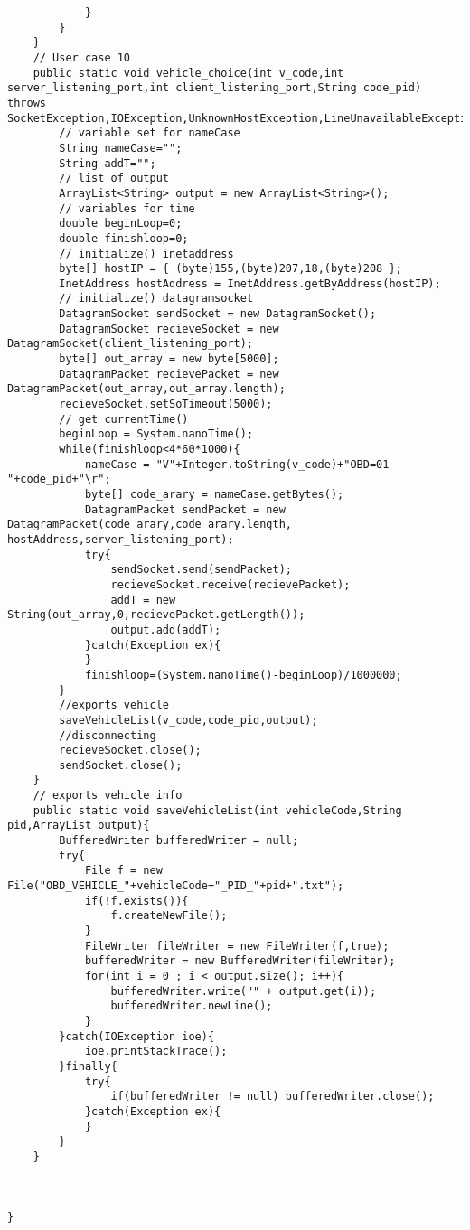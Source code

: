 \documentclass{article}
\begin{document}
\begin{lstlisting}
            }
        }
    }
    // User case 10
    public static void vehicle_choice(int v_code,int server_listening_port,int client_listening_port,String code_pid) throws SocketException,IOException,UnknownHostException,LineUnavailableException,ClassNotFoundException{
        // variable set for nameCase
        String nameCase="";
        String addT="";
        // list of output
        ArrayList<String> output = new ArrayList<String>();
        // variables for time
        double beginLoop=0;
        double finishloop=0;
        // initialize() inetaddress
        byte[] hostIP = { (byte)155,(byte)207,18,(byte)208 };
        InetAddress hostAddress = InetAddress.getByAddress(hostIP);
        // initialize() datagramsocket
        DatagramSocket sendSocket = new DatagramSocket();
        DatagramSocket recieveSocket = new DatagramSocket(client_listening_port);
        byte[] out_array = new byte[5000];
        DatagramPacket recievePacket = new DatagramPacket(out_array,out_array.length);
        recieveSocket.setSoTimeout(5000);
        // get currentTime()
        beginLoop = System.nanoTime();
        while(finishloop<4*60*1000){
            nameCase = "V"+Integer.toString(v_code)+"OBD=01 "+code_pid+"\r";
            byte[] code_arary = nameCase.getBytes();
            DatagramPacket sendPacket = new DatagramPacket(code_arary,code_arary.length, hostAddress,server_listening_port);
            try{
                sendSocket.send(sendPacket);
                recieveSocket.receive(recievePacket);
                addT = new String(out_array,0,recievePacket.getLength());
                output.add(addT);
            }catch(Exception ex){
            }
            finishloop=(System.nanoTime()-beginLoop)/1000000;
        }
        //exports vehicle
        saveVehicleList(v_code,code_pid,output);
        //disconnecting
        recieveSocket.close();
        sendSocket.close();
    }
    // exports vehicle info
    public static void saveVehicleList(int vehicleCode,String pid,ArrayList output){
        BufferedWriter bufferedWriter = null;
        try{
            File f = new File("OBD_VEHICLE_"+vehicleCode+"_PID_"+pid+".txt");
            if(!f.exists()){
                f.createNewFile();
            }
            FileWriter fileWriter = new FileWriter(f,true);
            bufferedWriter = new BufferedWriter(fileWriter);
            for(int i = 0 ; i < output.size(); i++){
                bufferedWriter.write("" + output.get(i));
                bufferedWriter.newLine();
            }
        }catch(IOException ioe){
            ioe.printStackTrace();
        }finally{
            try{
                if(bufferedWriter != null) bufferedWriter.close();
            }catch(Exception ex){
            }
        }
    }



}
\end{lstlisting}
\end{document}
